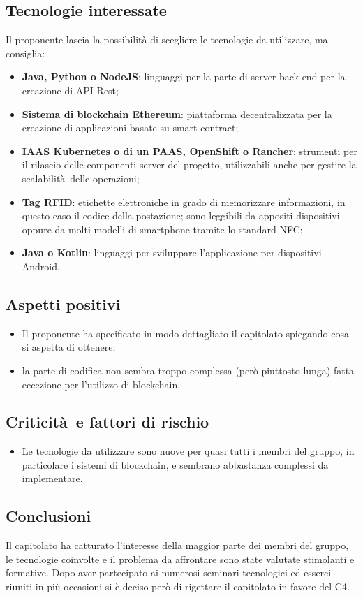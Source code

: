 \subsection{Tecnologie interessate}
Il proponente lascia la possibilità di scegliere le tecnologie da utilizzare, ma consiglia:
\begin{itemize}
    \item \textbf{Java, Python o NodeJS}: linguaggi per la parte di server back-end per la creazione di API Rest;
    \item \textbf{Sistema di blockchain Ethereum}: piattaforma decentralizzata per la creazione di applicazioni basate su smart-contract;
    \item \textbf{IAAS Kubernetes o di un PAAS, OpenShift o Rancher}: strumenti per il rilascio delle componenti server del progetto, utilizzabili anche per gestire la scalabilità delle operazioni;
    \item \textbf{Tag RFID}: etichette elettroniche in grado di memorizzare informazioni, in questo caso il codice della postazione; sono leggibili da appositi dispositivi oppure da molti modelli di smartphone tramite lo standard NFC;
    \item \textbf{Java o Kotlin}: linguaggi per sviluppare l'applicazione per dispositivi Android.
\end{itemize}
\subsection{Aspetti positivi}
\begin{itemize}
    \item Il proponente ha specificato in modo dettagliato il capitolato spiegando cosa si aspetta di ottenere;
    \item la parte di codifica non sembra troppo complessa (però piuttosto lunga) fatta eccezione per l'utilizzo di blockchain.
\end{itemize}
\subsection{Criticità e fattori di rischio}
\begin{itemize}
    \item Le tecnologie da utilizzare sono nuove per quasi tutti i membri del gruppo, in particolare i sistemi di blockchain, e sembrano abbastanza complessi da implementare.
\end{itemize}
\subsection{Conclusioni}
Il capitolato ha catturato l'interesse della maggior parte dei membri del gruppo, le tecnologie coinvolte e il problema da affrontare sono state valutate stimolanti e formative.
Dopo aver partecipato ai numerosi seminari tecnologici ed esserci riuniti in più occasioni si è deciso però di rigettare il capitolato in favore del C4.

